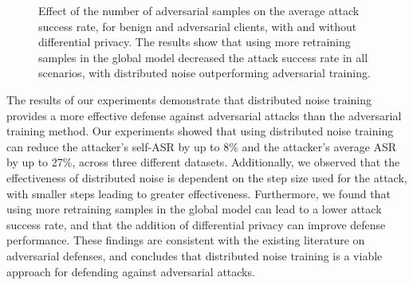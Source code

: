 \begin{figure*}[t!]
    \centering
    \begin{minipage}{1.2\textwidth} %
        \centering
        \hspace{-20pt}
        \hspace{-20pt}
    \end{minipage}

    \vspace{10pt} %

    \begin{minipage}{1.2\textwidth} %
        \centering
        \hspace{-20pt}
        \hspace{-20pt}
    \end{minipage}

    \caption{Effect of the number of adversarial samples on the average attack success rate, for benign and adversarial clients, with and without differential privacy. The results show that using more retraining samples in the global model decreased the attack success rate in all scenarios, with distributed noise outperforming adversarial training.}
    \label{fig: epsilon graphs}
\end{figure*}


The results of our experiments demonstrate that distributed noise training provides a more effective defense against adversarial attacks than the adversarial training method.  Our experiments showed that using distributed noise training can reduce the attacker's self-ASR by up to 8\% and the attacker's average ASR by up to 27\%, across three different datasets. Additionally, we observed that the effectiveness of distributed noise is dependent on the step size used for the attack, with smaller steps leading to greater effectiveness. Furthermore, we found that using more retraining samples in the global model can lead to a lower attack success rate, and that the addition of differential privacy can improve defense performance. These findings are consistent with the existing literature on adversarial defenses, and concludes that  distributed noise training is a viable approach for defending against adversarial attacks.
